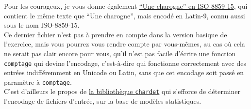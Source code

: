Pour les courageux, je vous donne également
\href{data/une_charogne_iso15.txt}{``Une charogne'' en ISO-8859-15}, qui
contient le même texte que ``Une charogne'', mais encodé en Latin-9,
connu aussi sous le nom ISO-8859-15.\\

Ce dernier fichier n'est pas à prendre en compte dans la version basique
de l'exercice, mais vous pourrez vous rendre compte par vous-mêmes, au
cas où cela ne serait pas clair encore pour vous, qu'il n'est pas facile
d'écrire une fonction \texttt{comptage} qui devine l'encodage,
c'est-à-dire qui fonctionne correctement avec des entrées indifféremment
en Unicode ou Latin, sans que cet encodage soit passé en paramètre à
\texttt{comptage}.\\

    C'est d'ailleurs le propos de
\href{https://pypi.python.org/pypi/chardet}{la bibliothèque
\texttt{chardet}} qui s'efforce de déterminer l'encodage de fichiers
d'entrée, sur la base de modèles statistiques.